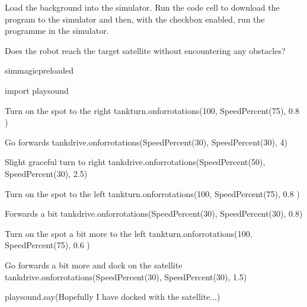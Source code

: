 \documentclass[letterpaper,10pt,english]{sphinxmanual}
\begin{document}
{Load the  background into the simulator. Run the code cell to download the program to the simulator and then, with the  checkbox enabled, run the programme in the simulator.


Does the robot reach the target satellite without encountering any obstacles?

{
\begin{sphinxVerbatim}[commandchars=\\\{\}]
\llap{\color{nbsphinxin}[ ]:\,\hspace{\fboxrule}\hspace{\fboxsep}}\PYGZpc{}\PYGZpc{}sim\PYGZus{}magic\PYGZus{}preloaded

import playsound

\PYGZsh{} Turn on the spot to the right
tank\PYGZus{}turn.on\PYGZus{}for\PYGZus{}rotations(100, SpeedPercent(75), 0.8 )

\PYGZsh{} Go forwards
tank\PYGZus{}drive.on\PYGZus{}for\PYGZus{}rotations(SpeedPercent(30), SpeedPercent(30), 4)

\PYGZsh{} Slight graceful turn to right
tank\PYGZus{}drive.on\PYGZus{}for\PYGZus{}rotations(SpeedPercent(50), SpeedPercent(30), 2.5)

\PYGZsh{} Turn on the spot to the left
tank\PYGZus{}turn.on\PYGZus{}for\PYGZus{}rotations(\PYGZhy{}100, SpeedPercent(75), 0.8 )

\PYGZsh{} Forwards a bit
tank\PYGZus{}drive.on\PYGZus{}for\PYGZus{}rotations(SpeedPercent(30), SpeedPercent(30), 0.8)

\PYGZsh{}Turn on the spot a bit more to the left
tank\PYGZus{}turn.on\PYGZus{}for\PYGZus{}rotations(\PYGZhy{}100, SpeedPercent(75), 0.6 )

\PYGZsh{} Go forwards a bit more and dock on the satellite
tank\PYGZus{}drive.on\PYGZus{}for\PYGZus{}rotations(SpeedPercent(30), SpeedPercent(30), 1.5)

playsound.say(\PYGZdq{}Hopefully I have docked with the satellite...\PYGZdq{})
\end{sphinxVerbatim}
}

}
\end{document}
